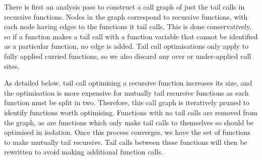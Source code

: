There is first an analysis pass to construct a call graph of just the tail calls in recursive functions. Nodes in the graph correspond to recursive functions, with each node having edges to the functions it tail calls. This is done conservatively, so if a function makes a tail call with a function variable that cannot be identified as a particular function, no edge is added.  Tail call optimisations only apply to fully applied curried functions, so we also discard any over or under-applied call sites.



As detailed below, tail call optimising a recursive function increases its size, and the optimisation is more expensive for mutually tail recursive functions as each function must be split in two. Therefore, this call graph is iteratively pruned to identify functions worth optimising. Functions with no tail calls are removed from the graph, as are functions which only make tail calls to themselves so should be optimised in isolation. Once this process converges, we have the set of functions to make mutually tail recursive. Tail calls between these functions will then be rewritten to avoid making additional function calls.

